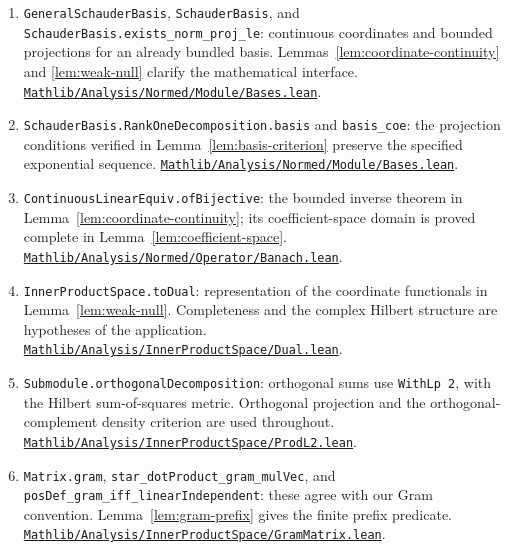 \documentclass[reqno,a4paper,12pt]{amsart}
\theoremstyle{definition}
\newcommand{\ml}[1]{\nolinkurl{#1}}
\begin{document}
\begin{enumerate}
\item \ml{GeneralSchauderBasis}, \ml{SchauderBasis}, and \ml{SchauderBasis.exists_norm_proj_le}: continuous coordinates and bounded projections for an already bundled basis. Lemmas~\ref{lem:coordinate-continuity} and \ref{lem:weak-null} clarify the mathematical interface.
\href{https://github.com/leanprover-community/mathlib4/blob/1ddfaa9548e05b343be9248ae08b73c3425b446e/Mathlib/Analysis/Normed/Module/Bases.lean#L104}{\ml{Mathlib/Analysis/Normed/Module/Bases.lean}}.
\item \ml{SchauderBasis.RankOneDecomposition.basis} and \ml{basis_coe}: the projection conditions verified in Lemma~\ref{lem:basis-criterion} preserve the specified exponential sequence.
\href{https://github.com/leanprover-community/mathlib4/blob/1ddfaa9548e05b343be9248ae08b73c3425b446e/Mathlib/Analysis/Normed/Module/Bases.lean#L464}{\ml{Mathlib/Analysis/Normed/Module/Bases.lean}}.
\item \ml{ContinuousLinearEquiv.ofBijective}: the bounded inverse theorem in Lemma~\ref{lem:coordinate-continuity}; its coefficient-space domain is proved complete in Lemma~\ref{lem:coefficient-space}.
\href{https://github.com/leanprover-community/mathlib4/blob/1ddfaa9548e05b343be9248ae08b73c3425b446e/Mathlib/Analysis/Normed/Operator/Banach.lean#L439}{\ml{Mathlib/Analysis/Normed/Operator/Banach.lean}}.
\item \ml{InnerProductSpace.toDual}: representation of the coordinate functionals in Lemma~\ref{lem:weak-null}. Completeness and the complex Hilbert structure are hypotheses of the application.
\href{https://github.com/leanprover-community/mathlib4/blob/1ddfaa9548e05b343be9248ae08b73c3425b446e/Mathlib/Analysis/InnerProductSpace/Dual.lean#L136}{\ml{Mathlib/Analysis/InnerProductSpace/Dual.lean}}.
\item \ml{Submodule.orthogonalDecomposition}: orthogonal sums use \ml{WithLp 2}, with the Hilbert sum-of-squares metric. Orthogonal projection and the orthogonal-complement density criterion are used throughout.
\href{https://github.com/leanprover-community/mathlib4/blob/1ddfaa9548e05b343be9248ae08b73c3425b446e/Mathlib/Analysis/InnerProductSpace/ProdL2.lean#L88}{\ml{Mathlib/Analysis/InnerProductSpace/ProdL2.lean}}.
\item \ml{Matrix.gram}, \ml{star_dotProduct_gram_mulVec}, and \ml{posDef_gram_iff_linearIndependent}: these agree with our Gram convention. Lemma~\ref{lem:gram-prefix} gives the finite prefix predicate.
\href{https://github.com/leanprover-community/mathlib4/blob/1ddfaa9548e05b343be9248ae08b73c3425b446e/Mathlib/Analysis/InnerProductSpace/GramMatrix.lean#L40}{\ml{Mathlib/Analysis/InnerProductSpace/GramMatrix.lean}}.

\end{enumerate}
\end{document}
